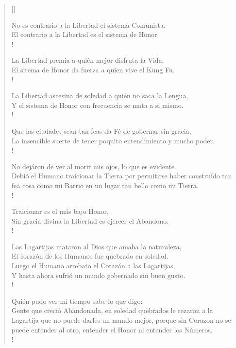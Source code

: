 \documentclass[11pt, a4paper]{article} %
\newcommand{\poemauthorright}[1]{\nopagebreak{\raggedleft\footnotesize\textsc{#1}\par}} %
\begin{document}

\settowidth{\versewidth}{Quiere mi tiempo libre la sutil, flexible dicha de buscarla, ------------------------------------------------------------------} %

\begin{verse}[\versewidth]
    {\scriptsize
    No es contrario a la Libertad el sistema Comunista. \\
    El contrario a la Libertad es el sistema de Honor. \\!

    La Libertad premia a quién mejor disfruta la Vida, \\
    El sitema de Honor da fuerza a quien vive el Kung Fu. \\!

    La Libertad ascesina de soledad a quién no saca la Lengua, \\
    Y el sistema de Honor con frecuencia se mata a si mismo. \\!

    Que las ciudades sean tan feas da Fé de gobernar sin gracia, \\
    La insencible suerte de tener poquito entendimiento y mucho poder. \\!

    No dejáron de ver al morir mis ojos, lo que es evidente. \\
    Debió el Humano traicionar la Tierra por permitirse haber construído 
    tan fea cosa como mi Barrio en un lugar tan bello como mi Tierra. \\!

    Traicionar es el más bajo Honor, \\
    Sin gracia divina la Libertad es ejercer el Abandono. \\!
    
    Las Lagartijas mataron al Dios que amaba la naturaleza, \\
    El corazón de los Humanos fue quebrado en soledad. \\
    Luego el Humano arrebato el Corazón a las Lagartijas, \\
    Y hasta ahora sufrió un mundo gobernado sin buen gusto. \\!

    Quién pudo ver mi tiempo sabe lo que digo: \\
    Gente que creció Abandonada, en soledad quebrados le rezaron a la Lagartija 
    que no puede darles un mundo mejor, porque sin Corazon no se puede entender 
    al otro, entender el Honor ni entender los Números. \\!


}
\end{verse}


\poemauthorright{WAAJACU} %

\end{document}
